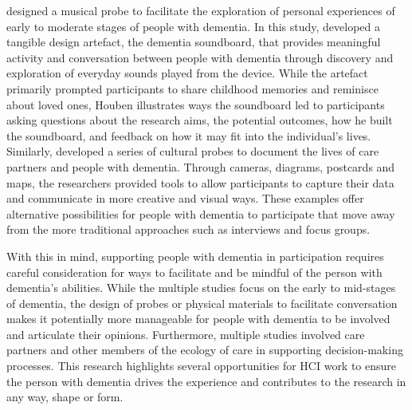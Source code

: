 \cite{houben_foregrounding_2019} designed a musical probe to facilitate the exploration of personal experiences of early to moderate stages of people with dementia. In this study, \citeauthor{houben_foregrounding_2019} developed a tangible design artefact, the dementia soundboard, that provides meaningful activity and conversation between people with dementia through discovery and exploration of everyday sounds played from the device. While the artefact primarily prompted participants to share childhood memories and reminisce about loved ones, Houben illustrates ways the soundboard led to participants asking questions about the research aims, the potential outcomes, how he built the soundboard, and feedback on how it may fit into the individual's lives. Similarly, \cite{brown2014using} developed a series of cultural probes to document the lives of care partners and people with dementia. Through cameras, diagrams, postcards and maps, the researchers provided tools to allow participants to capture their data and communicate in more creative and visual ways. These examples offer alternative possibilities for people with dementia to participate that move away from the more traditional approaches such as interviews and focus groups. 

With this in mind, supporting people with dementia in participation requires careful consideration for ways to facilitate and be mindful of the person with dementia's abilities. While the multiple studies focus on the early to mid-stages of dementia, the design of probes or physical materials to facilitate conversation makes it potentially more manageable for people with dementia to be involved and articulate their opinions. Furthermore, multiple studies involved care partners and other members of the ecology of care in supporting decision-making processes. This research highlights several opportunities for HCI work to ensure the person with dementia drives the experience and contributes to the research in any way, shape or form.

